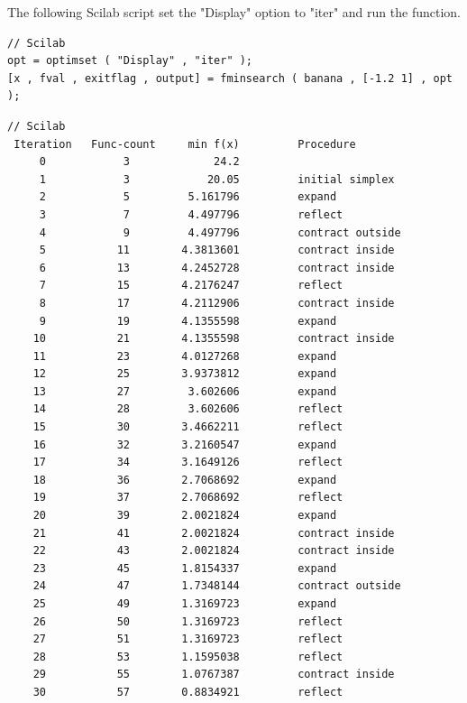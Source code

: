 The following Scilab script set the "Display" option to "iter" and 
run the  function.

\lstset{language=scilabscript}
\begin{lstlisting}
// Scilab
opt = optimset ( "Display" , "iter" );
[x , fval , exitflag , output] = fminsearch ( banana , [-1.2 1] , opt );
\end{lstlisting}

\lstset{language=scilabscript}
\begin{lstlisting}
// Scilab
 Iteration   Func-count     min f(x)         Procedure
     0            3             24.2            
     1            3            20.05         initial simplex     
     2            5         5.161796         expand              
     3            7         4.497796         reflect             
     4            9         4.497796         contract outside    
     5           11        4.3813601         contract inside     
     6           13        4.2452728         contract inside     
     7           15        4.2176247         reflect             
     8           17        4.2112906         contract inside     
     9           19        4.1355598         expand              
    10           21        4.1355598         contract inside     
    11           23        4.0127268         expand              
    12           25        3.9373812         expand              
    13           27         3.602606         expand              
    14           28         3.602606         reflect             
    15           30        3.4662211         reflect             
    16           32        3.2160547         expand              
    17           34        3.1649126         reflect             
    18           36        2.7068692         expand              
    19           37        2.7068692         reflect             
    20           39        2.0021824         expand              
    21           41        2.0021824         contract inside     
    22           43        2.0021824         contract inside     
    23           45        1.8154337         expand              
    24           47        1.7348144         contract outside    
    25           49        1.3169723         expand              
    26           50        1.3169723         reflect             
    27           51        1.3169723         reflect             
    28           53        1.1595038         reflect             
    29           55        1.0767387         contract inside     
    30           57        0.8834921         reflect             

\end{lstlisting}
